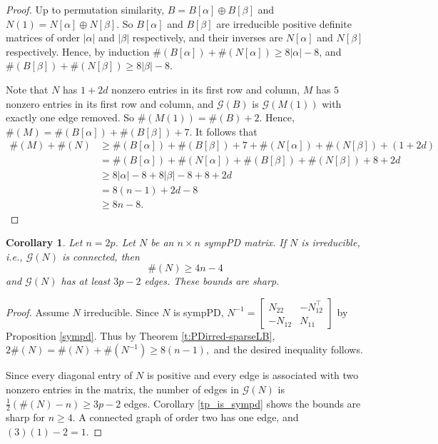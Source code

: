 \documentclass[12pt]{article}
\newtheorem{cor}[thm]{Corollary}
\theoremstyle{definition}
\theoremstyle{definition}
\theoremstyle{definition}
\numberwithin{figure}{section}
\numberwithin{equation}{section}
\newcommand{\G}{\mathcal{G}}
\newcommand{\trans}{^{\top}}
\newcommand{\mtx}[1]{\begin{bmatrix} #1 \end{bmatrix}}
\begin{document}
\begin{proof}
Up to permutation similarity, 
$B= B[\alpha]  \oplus B[\beta ]$
and $N(1)= N[\alpha] \oplus N[\beta]$. So $B[\alpha]$ and $B[\beta]$ are irreducible positive definite matrices of order $|\alpha|$ and $|\beta|$ respectively, and their inverses are $N[\alpha]$ and $N[\beta]$ respectively. 
Hence, by induction $\#(B[\alpha]) + \#(N[\alpha])\geq 8|\alpha| - 8$, and 
$\#(B[\beta]) + \#(N[\beta])\geq 8|\beta|-8$.


Note that $N$ has $1+ 2 {d}$ nonzero entries in its first row and column,  $M$ has $5$ nonzero entries in its first row and column, and $\G(B)$ is $\G(M(1))$ with exactly one edge removed.  
So $\#(M(1))=
\#(B)+2$. Hence, $\#(M) =\#(B[\alpha]) + \#(B[\beta])+7$.
It follows that 
\begin{align*} 
\#(M) +\#(N)  
&\geq \#(B[\alpha]) + \#(B[\beta]) +7 + \#(N[\alpha]) + \#(N[\beta]) + (1+ 2d)
\\
&= \#(B[\alpha]) + \#(N[\alpha])+ \#(B[\beta]) + \#(N[\beta]) +8 + 2d \\
&\geq 8|\alpha|-8+ 8|\beta|-8 + 8+ 2d \\
&=8(n-1) + 2d -8 
\\
&\geq 8n-8.
\end{align*}
\qedhere 
\end{proof}



\begin{cor}\label{c:sympPD-sparseLB} Let $n=2p$. 
Let $N$ be an  $n \times n$ sympPD matrix.  If $N$ is irreducible, i.e., $\G(N)$ is connected, then 
\[
\#(N) \geq 4n-4
\]
and $\G(N)$ has at least $3p-2$ edges. These bounds are sharp. 
\end{cor}

\begin{proof}
Assume $N$ irreducible.  Since $N$ is sympPD, $N^{-1}= \mtx{ N_{22}& -N_{12}\trans \\ 
-N_{12} & N_{11} }$ by Proposition \ref{sympd}.
Thus by Theorem \ref{t:PDirred-sparseLB},
$ 
2\#(N) = \#(N) + \#(N^{-1}) \geq 8(n-1),
$
and  the desired inequality follows. 

Since every diagonal entry of $N$ is positive and every edge is associated with two nonzero entries in the matrix, the number of edges in $\G(N)$ is $\frac 1 2(\#(N)-n)\ge 3p-2$ edges.
 Corollary \ref{tp_is_sympd} shows the bounds are sharp for $n\ge 4$.  A connected graph of order two has one edge, and $(3)(1)-2=1$.
\end{proof}
\end{document}
